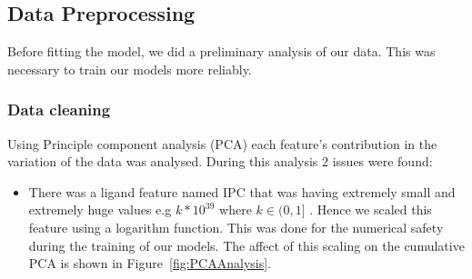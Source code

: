 \documentclass[11pt]{article}
\begin{document}
\subsection{Data Preprocessing}
Before fitting the model, we did a preliminary analysis of our data.  This was necessary to train our models more reliably.

\subsubsection{Data cleaning}
Using Principle component analysis (PCA) each feature's contribution in the variation of the data was analysed. 
During this analysis 2 issues were found:
\begin{itemize}
\item There was a ligand feature named IPC that was having extremely small and extremely huge values e.g $k * 10^{39}$ where $k \in (0,1]$ .
Hence we scaled this feature using a logarithm function.
This was done for the numerical safety during the training of our models.
The affect of this scaling on the cumulative PCA is shown in Figure~\ref{fig:PCAAnalysis}. 


\end{itemize}
\end{document}
